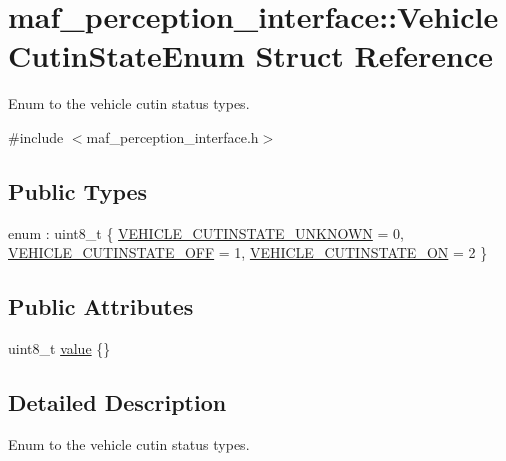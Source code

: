 \hypertarget{structmaf__perception__interface_1_1VehicleCutinStateEnum}{}\section{maf\+\_\+perception\+\_\+interface\+:\+:Vehicle\+Cutin\+State\+Enum Struct Reference}
\label{structmaf__perception__interface_1_1VehicleCutinStateEnum}


Enum to the vehicle cutin status types.  




{\ttfamily \#include $<$maf\+\_\+perception\+\_\+interface.\+h$>$}

\subsection*{Public Types}
\begin{DoxyCompactItemize}
\item 
enum \+: uint8\+\_\+t \{ \hyperlink{structmaf__perception__interface_1_1VehicleCutinStateEnum_a24f8c033e83d473e39c23d10781e098ba9a00bb678ae4856d9c1fdd17ac624682}{V\+E\+H\+I\+C\+L\+E\+\_\+\+C\+U\+T\+I\+N\+S\+T\+A\+T\+E\+\_\+\+U\+N\+K\+N\+O\+WN} = 0, 
\hyperlink{structmaf__perception__interface_1_1VehicleCutinStateEnum_a24f8c033e83d473e39c23d10781e098ba8fb5004e53d192e726932c571e2ef4dd}{V\+E\+H\+I\+C\+L\+E\+\_\+\+C\+U\+T\+I\+N\+S\+T\+A\+T\+E\+\_\+\+O\+FF} = 1, 
\hyperlink{structmaf__perception__interface_1_1VehicleCutinStateEnum_a24f8c033e83d473e39c23d10781e098ba8d58d1909ab4a8e706657ae2904627ad}{V\+E\+H\+I\+C\+L\+E\+\_\+\+C\+U\+T\+I\+N\+S\+T\+A\+T\+E\+\_\+\+ON} = 2
 \}
\end{DoxyCompactItemize}
\subsection*{Public Attributes}
\begin{DoxyCompactItemize}
\item 
uint8\+\_\+t \hyperlink{structmaf__perception__interface_1_1VehicleCutinStateEnum_abbcfba82280dcd2a1daa9c6704a1c25e}{value} \{\}
\end{DoxyCompactItemize}


\subsection{Detailed Description}
Enum to the vehicle cutin status types. 

